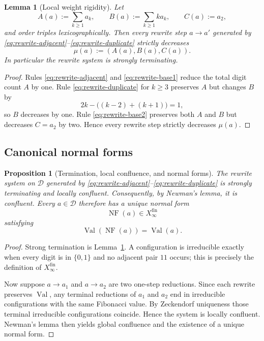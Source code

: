 \documentclass[11pt,letterpaper]{article}
\numberwithin{equation}{section}
\theoremstyle{plain}
\newtheorem{lemma}[theorem]{Lemma}
\newtheorem{proposition}[theorem]{Proposition}
\theoremstyle{definition}
\theoremstyle{remark}
\newcommand{\Xfin}{X_\infty^{\mathrm{fin}}}
\DeclareMathOperator{\Val}{Val}
\DeclareMathOperator{\NF}{NF}
\begin{document}
\begin{lemma}[Local weight rigidity]
\label{lem:local-weight-rigidity}
Let
\[
A(a):=\sum_{k\ge 1} a_k,
\qquad
B(a):=\sum_{k\ge 1} ka_k,
\qquad
C(a):=a_2,
\]
and order triples lexicographically.  Then every rewrite step
$a\to a'$ generated by \eqref{eq:rewrite-adjacent}--\eqref{eq:rewrite-duplicate}
strictly decreases
\[
\mu(a):=(A(a),B(a),C(a)).
\]
In particular the rewrite system is strongly terminating.
\end{lemma}

\begin{proof}
Rules \eqref{eq:rewrite-adjacent} and \eqref{eq:rewrite-base1} reduce the total
digit count $A$ by one.  Rule \eqref{eq:rewrite-duplicate} for $k\ge 3$
preserves $A$ but changes $B$ by
\[
2k-\bigl((k-2)+(k+1)\bigr)=1,
\]
so $B$ decreases by one.  Rule \eqref{eq:rewrite-base2} preserves both $A$ and
$B$ but decreases $C=a_2$ by two.  Hence every rewrite step strictly decreases
$\mu(a)$.
\end{proof}

\subsection{Canonical normal forms}

\begin{proposition}[Termination, local confluence, and normal forms]
\label{prop:rewrite-newman}
The rewrite system on $\mathcal D$ generated by
\eqref{eq:rewrite-adjacent}--\eqref{eq:rewrite-duplicate} is strongly
terminating and locally confluent.  Consequently, by Newman's lemma, it is
confluent.  Every $a\in\mathcal D$ therefore has a unique normal form
\[
\NF(a)\in\Xfin
\]
satisfying
\[
\Val(\NF(a))=\Val(a).
\]
\end{proposition}

\begin{proof}
Strong termination is Lemma~\ref{lem:local-weight-rigidity}.  A configuration
is irreducible exactly when every digit is in $\{0,1\}$ and no adjacent pair
$11$ occurs; this is precisely the definition of $\Xfin$.

Now suppose $a\to a_1$ and $a\to a_2$ are two one-step reductions.  Since each
rewrite preserves $\Val$, any terminal reductions of $a_1$ and $a_2$ end in
irreducible configurations with the same Fibonacci value.  By Zeckendorf
uniqueness those terminal irreducible configurations coincide.  Hence the
system is locally confluent.  Newman's lemma then yields global confluence and
the existence of a unique normal form.
\end{proof}
\end{document}
